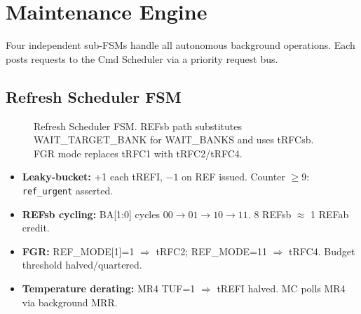 \documentclass[10pt,a4paper]{article}
\begin{document}
\section{Maintenance Engine}

Four independent sub-FSMs handle all autonomous background operations. Each posts requests
to the Cmd Scheduler via a priority request bus.

\subsection{Refresh Scheduler FSM}

\begin{figure}[h]
\centering
{}
\caption{Refresh Scheduler FSM. REFsb path substitutes WAIT\_TARGET\_BANK for WAIT\_BANKS
         and uses tRFCsb. FGR mode replaces tRFC1 with tRFC2/tRFC4.}
\end{figure}

\begin{itemize}
  \item \textbf{Leaky-bucket:} +1 each tREFI, $-1$ on REF issued. Counter $\geq$9: \texttt{ref\_urgent} asserted.
  \item \textbf{REFsb cycling:} BA[1:0] cycles $00\to01\to10\to11$. 8 REFsb $\approx$ 1 REFab credit.
  \item \textbf{FGR:} REF\_MODE[1]=1 $\Rightarrow$ tRFC2; REF\_MODE=11 $\Rightarrow$ tRFC4. Budget threshold halved/quartered.
  \item \textbf{Temperature derating:} MR4 TUF=1 $\Rightarrow$ tREFI halved. MC polls MR4 via background MRR.
\end{itemize}
\end{document}
